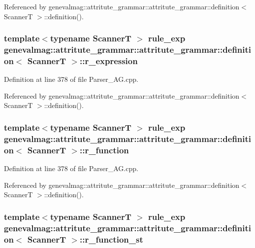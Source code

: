 Referenced by genevalmag::attritute\_\-grammar::attritute\_\-grammar::definition$<$ ScannerT $>$::definition().\hypertarget{structgenevalmag_1_1attritute__grammar_1_1definition_db5e77b2b1c14179717b212159d201fe}{
\subsubsection[{r\_\-expression}]{\setlength{\rightskip}{0pt plus 5cm}template$<$typename ScannerT $>$ {\bf rule\_\-exp} genevalmag::attritute\_\-grammar::attritute\_\-grammar::definition$<$ ScannerT $>$::{\bf r\_\-expression}}}
\label{structgenevalmag_1_1attritute__grammar_1_1definition_db5e77b2b1c14179717b212159d201fe}




Definition at line 378 of file Parser\_\-AG.cpp.

Referenced by genevalmag::attritute\_\-grammar::attritute\_\-grammar::definition$<$ ScannerT $>$::definition().\hypertarget{structgenevalmag_1_1attritute__grammar_1_1definition_78686264d70a6e964ab0857a9ffb15bc}{
\subsubsection[{r\_\-function}]{\setlength{\rightskip}{0pt plus 5cm}template$<$typename ScannerT $>$ {\bf rule\_\-exp} genevalmag::attritute\_\-grammar::attritute\_\-grammar::definition$<$ ScannerT $>$::{\bf r\_\-function}}}
\label{structgenevalmag_1_1attritute__grammar_1_1definition_78686264d70a6e964ab0857a9ffb15bc}




Definition at line 378 of file Parser\_\-AG.cpp.

Referenced by genevalmag::attritute\_\-grammar::attritute\_\-grammar::definition$<$ ScannerT $>$::definition().\hypertarget{structgenevalmag_1_1attritute__grammar_1_1definition_680197c575c96bc5acdbe292489e5ef1}{
\subsubsection[{r\_\-function\_\-st}]{\setlength{\rightskip}{0pt plus 5cm}template$<$typename ScannerT $>$ {\bf rule\_\-exp} genevalmag::attritute\_\-grammar::attritute\_\-grammar::definition$<$ ScannerT $>$::{\bf r\_\-function\_\-st}}}
\label{structgenevalmag_1_1attritute__grammar_1_1definition_680197c575c96bc5acdbe292489e5ef1}




